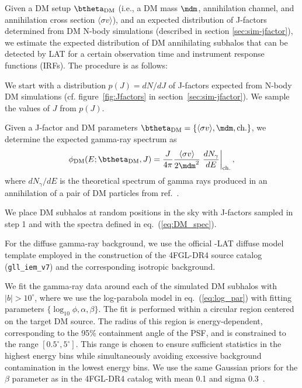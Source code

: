 Given a DM setup $\btheta_\textrm{DM}$ (i.e., a DM mass ${\mdm}$, annihilation channel,
and annihilation cross section $\langle\sigma v\rangle$), and an expected distribution of J-factors  determined from DM N-body simulations (described in section \ref{sec:sim-jfactor}), 
we estimate the expected distribution of DM annihilating subhalos that can be detected by {\Fermi} LAT for a certain observation time and instrument response functions (IRFs). 
The procedure is as follows:
\ben
\item
We start with a distribution $p(J) = dN / dJ$ of J-factors expected from N-body DM simulations (cf. figure~\ref{fig:Jfactors} in section~\ref{sec:sim-jfactor}). We sample the values of $J$ from $p(J)$. 
\item
Given a J-factor and DM parameters
$\btheta_\textrm{DM} = \{\langle\sigma v\rangle, {\mdm}, \textrm{ch.}\}$, 
we determine the expected gamma-ray spectrum as
\begin{equation}
\label{eq:DM_spec}
\phi_\textrm{DM}(E;\btheta_\textrm{DM}, J) = \frac{J}{4\pi} \frac{\langle \sigma v \rangle}{2\mdm^2} \left.\frac{dN_\gamma}{dE}\right|_\textrm{ch.},
\end{equation}
where $dN_\gamma/dE$ is the theoretical spectrum of gamma rays produced in an annihilation of a pair of DM particles from ref.~\cite{2024JCAP...03..035A}. 
\item
We place DM subhalos at random positions in the sky with J-factors sampled in step 1 and with the spectra defined in eq.~(\ref{eq:DM_spec}).
\item 
For the diffuse gamma-ray background, we use the official \Fermi-LAT diffuse model template employed in the construction of the 4FGL-DR4 source catalog (\verb|gll_iem_v7|) and the corresponding isotropic background.
\item
We fit the gamma-ray data around each of the simulated DM subhalos with $|b| > 10^\circ$,
where we use the log-parabola model in eq.~(\ref{eq:log_par}) with fitting parameters $\{\log_{10}\phi, \alpha,\beta\}$. 
The fit is performed within a circular region centered on the target DM source. The radius of this region is energy-dependent, corresponding to the 95\% containment angle of the PSF, and is constrained to the range $[0.5^\circ, 5^\circ]$. This range is chosen to ensure sufficient statistics in the highest energy bins while simultaneously avoiding excessive background contamination in the lowest energy bins.
We use the same Gaussian priors for the $\beta$ parameter as in the 4FGL-DR4 catalog with mean 0.1 and sigma 0.3~\cite{2023arXiv230712546B}.
